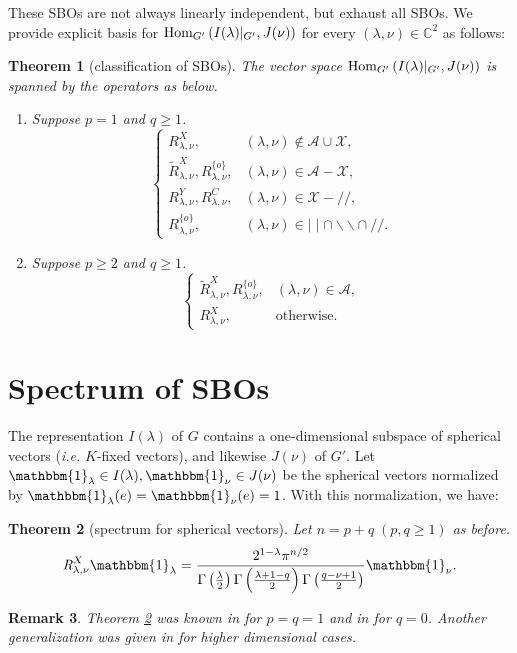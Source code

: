 \documentclass[reqno,12pt]{pja00} %
\newtheorem{theorem}{Theorem}[section]
\newcommand{\Hom}{\mbox{\normalfont Hom}}
\newtheorem{remark}[theorem]{Remark}
\theoremstyle{definition}
\theoremstyle{exampstyle} \newtheorem{examp}[theorem]{Theorem}
\newcommand{\OpR}{\mbox{\it R}}
\newcommand{\IlambdaGprime}{I(\lambda)\kern-0.3em\mid_{G'}}
\newcommand{\SBO}{\Hom_{G'}\left(\IlambdaGprime,J(\nu) \right)}
\begin{document}
These SBOs are not always linearly independent, but exhaust all SBOs. We provide explicit
basis for $\SBO$ for every $(\lambda,\nu)\in \mathbb{C}^2$ as follows:
\begin{theorem}[classification of SBOs]\label{thm:classif}
	The vector space $\Hom_{G'}\left( I(\lambda)\kern-0.1cm\mid_{G'},J(\nu) \right)$ is spanned by the operators as below.
	\begin{enumerate}[(1)]
		\item Suppose $p=1$ and $q\ge1$.
			\begin{equation*}
\left\{
   \begin{array}{ll}
	   R^X_{\lambda, \nu}, & (\lambda, \nu) \notin \mathcal{A}\cup\mathcal{X},\\
      \tilde{R}^X_{\lambda, \nu} , R^{\{ o
     \}}_{\lambda, \nu}, & (\lambda, \nu) \in \mathcal{A} -\mathcal{X},\\
     R^Y_{\lambda, \nu} , R^C_{\lambda, \nu}, &
     (\lambda, \nu) \in \mathcal{X} - / /,\\
     R^{\{ o \}}_{\lambda, \nu}, & (\lambda, \nu) \in \mid \mid
     \cap \backslash\backslash \cap / /.
   \end{array} \right.
			\end{equation*}
		\item Suppose $p\ge2$ and $q\ge1$.
			\begin{equation*}
\left\{
   \begin{array}{ll}
      \tilde{R}^X_{\lambda, \nu} , R^{\{ o
     \}}_{\lambda, \nu}, & (\lambda, \nu) \in \mathcal{A},\\
     R^X_{\lambda, \nu}, & \mbox{otherwise.}
   \end{array} \right. 
			\end{equation*}
	\end{enumerate}
\end{theorem}
\section{Spectrum of SBOs}
The representation $I(\lambda)$ of $G$ contains a one-dimensional subspace of spherical vectors ({\it i.e.} $K$-fixed vectors), and likewise $J(\nu)$ of $G'$.
Let $\mathbbm{1}_\lambda\in I(\lambda),\mathbbm{1}_\nu\in J(\nu)$ be the spherical vectors normalized by $\mathbbm{1}_\lambda(e)=\mathbbm{1}_\nu(e)=1$. With this normalization, we have:
\begin{theorem}[spectrum for spherical vectors]\label{thm:spherical}
	Let $n=p+q\;(p,q\ge1)$ as before.
\[ \OpR^X_{\lambda, \nu} \mathbbm{1}_{\lambda} =  \frac{2^{1 -
\lambda}\pi^{n / 2}}{\Gamma \left( \frac{\lambda}{2} \right)
\Gamma \left(  \frac{\lambda + 1-q}{2} \right) \Gamma \left(
\frac{q - \nu + 1}{2} \right)} \mathbbm{1}_{\nu}. \]
\end{theorem}
\begin{remark}
	Theorem \ref{thm:spherical} was known in \cite[Lem.\ A.5]{bernstein2004estimates} for $p=q=1$ and in \cite[Prop.\ 7.4]{kobayashi2015symmetry} for $q=0$.
 	Another generalization was given in \cite[Thm.\ 1.1]{clerc2011generalized}
	for higher dimensional cases.
\end{remark}
\end{document}
